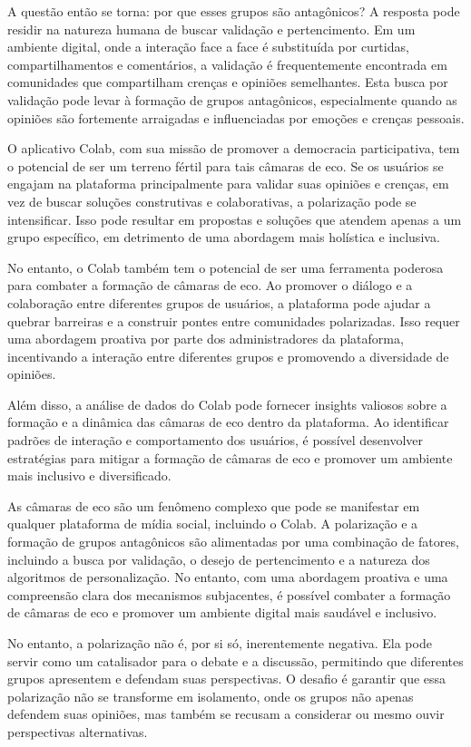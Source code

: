 A questão então se torna: por que esses grupos são antagônicos? A resposta pode residir na natureza humana de buscar validação e pertencimento. Em um ambiente digital, onde a interação face a face é substituída por curtidas, compartilhamentos e comentários, a validação é frequentemente encontrada em comunidades que compartilham crenças e opiniões semelhantes. Esta busca por validação pode levar à formação de grupos antagônicos, especialmente quando as opiniões são fortemente arraigadas e influenciadas por emoções e crenças pessoais.

O aplicativo Colab, com sua missão de promover a democracia participativa, tem o potencial de ser um terreno fértil para tais câmaras de eco. Se os usuários se engajam na plataforma principalmente para validar suas opiniões e crenças, em vez de buscar soluções construtivas e colaborativas, a polarização pode se intensificar. Isso pode resultar em propostas e soluções que atendem apenas a um grupo específico, em detrimento de uma abordagem mais holística e inclusiva.

No entanto, o Colab também tem o potencial de ser uma ferramenta poderosa para combater a formação de câmaras de eco. Ao promover o diálogo e a colaboração entre diferentes grupos de usuários, a plataforma pode ajudar a quebrar barreiras e a construir pontes entre comunidades polarizadas. Isso requer uma abordagem proativa por parte dos administradores da plataforma, incentivando a interação entre diferentes grupos e promovendo a diversidade de opiniões.

Além disso, a análise de dados do Colab pode fornecer insights valiosos sobre a formação e a dinâmica das câmaras de eco dentro da plataforma. Ao identificar padrões de interação e comportamento dos usuários, é possível desenvolver estratégias para mitigar a formação de câmaras de eco e promover um ambiente mais inclusivo e diversificado.

As câmaras de eco são um fenômeno complexo que pode se manifestar em qualquer plataforma de mídia social, incluindo o Colab. A polarização e a formação de grupos antagônicos são alimentadas por uma combinação de fatores, incluindo a busca por validação, o desejo de pertencimento e a natureza dos algoritmos de personalização. No entanto, com uma abordagem proativa e uma compreensão clara dos mecanismos subjacentes, é possível combater a formação de câmaras de eco e promover um ambiente digital mais saudável e inclusivo.

No entanto, a polarização não é, por si só, inerentemente negativa. Ela pode servir como um catalisador para o debate e a discussão, permitindo que diferentes grupos apresentem e defendam suas perspectivas. O desafio é garantir que essa polarização não se transforme em isolamento, onde os grupos não apenas defendem suas opiniões, mas também se recusam a considerar ou mesmo ouvir perspectivas alternativas.

